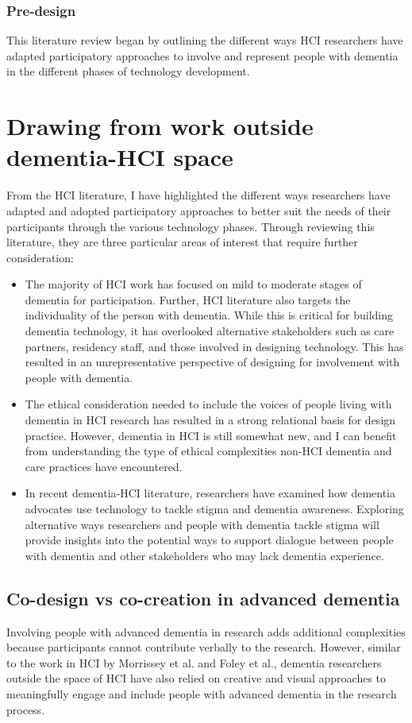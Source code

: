 \subsubsection{Pre-design}
\label{BL:Pre-Design}
This literature review began by outlining the different ways HCI researchers have adapted participatory approaches to involve and represent people with dementia in the different phases of technology development. 

\section{Drawing from work outside dementia-HCI space}
\label{BL:Outside-HCI}
From the HCI literature, I have highlighted the different ways researchers have adapted and adopted participatory approaches to better suit the needs of their participants through the various technology phases. Through reviewing this literature, they are three particular areas of interest that require further consideration:
\begin{itemize}
    \item The majority of HCI work has focused on mild to moderate stages of dementia for participation. Further, HCI literature also targets the individuality of the person with dementia. While this is critical for building dementia technology, it has overlooked alternative stakeholders such as care partners, residency staff, and those involved in designing technology. This has resulted in an unrepresentative perspective of designing for involvement with people with dementia. 
    
    \item The ethical consideration needed to include the voices of people living with dementia in HCI research has resulted in a strong relational basis for design practice. However, dementia in HCI is still somewhat new, and I can benefit from understanding the type of ethical complexities non-HCI dementia and care practices have encountered.
    
    \item In recent dementia-HCI literature, researchers have examined how dementia advocates use technology to tackle stigma and dementia awareness. Exploring alternative ways researchers and people with dementia tackle stigma will provide insights into the potential ways to support dialogue between people with dementia and other stakeholders who may lack dementia experience.
\end{itemize}

\subsection{Co-design vs co-creation in advanced dementia}
Involving people with advanced dementia in research adds additional complexities because participants cannot contribute verbally to the research. However, similar to the work in HCI by Morrissey et al. and Foley et al., dementia researchers outside the space of HCI have also relied on creative and visual approaches to meaningfully engage and include people with advanced dementia in the research process.

